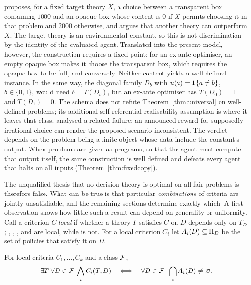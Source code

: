 \begin{remark}\label{rem:skalse}
\textcite{skalse2021} proposes, for a fixed target theory $X$, a choice between a transparent box
containing $1000$ and an opaque box whose content is $0$ if $X$ permits choosing it in that problem and
$2000$ otherwise, and argues that another theory can outperform $X$. The target theory is an
environmental constant, so this is not discrimination by the identity of the evaluated agent.
Translated into the present model, however, the construction requires a fixed point: for an ex-ante
optimiser, an empty opaque box makes it choose the transparent box, which requires the opaque box to
be full, and conversely. Neither content yields a well-defined instance. In the same way, the
diagonal family $D_b$ with $u(a)=\mathbf{1}\{a\neq b\}$, $b\in\{0,1\}$, would need $b=T(D_b)$, but an ex-ante
optimiser has $T(D_0)=1$ and $T(D_1)=0$. The schema does not refute Theorem~\ref{thm:universal} on
well-defined problems; its additional self-referential realisability assumption is where it leaves
that class. \textcite{lewis1981rich} analysed a related failure: an announced reward for supposedly
irrational choice can render the proposed scenario inconsistent. The verdict depends on the problem
being a finite object whose data include the constant's output. When problems are given as programs,
so that the agent must compute that output itself, the same construction is well defined and defeats
every agent that halts on all inputs (Theorem~\ref{thm:fixedcopy}).
\end{remark}

The unqualified thesis that no decision theory is optimal on all fair problems is therefore false.
What can be true is that particular \emph{combinations} of criteria are jointly unsatisfiable, and
the remaining sections determine exactly which. A first observation shows how little such a result
can depend on generality or uniformity. Call a criterion $C$ \emph{local} if whether a theory $T$
satisfies $C$ on $D$ depends only on $T_D$; , , , and  are local, while
 is not. For a local criterion $C_i$ let $A_i(D)\subseteq\Pi_D$ be the set of policies that
satisfy it on $D$.

\begin{lemma}\label{lem:pointwise}
For local criteria $C_1,\dots,C_k$ and a class $\mathcal{F}$,
\[
  \exists T\;\forall D\in\mathcal{F}\;\bigwedge_{i}C_i(T,D)
  \quad\Longleftrightarrow\quad
  \forall D\in\mathcal{F}\;\;\bigcap_{i}A_i(D)\neq\varnothing.
\]
\end{lemma}


